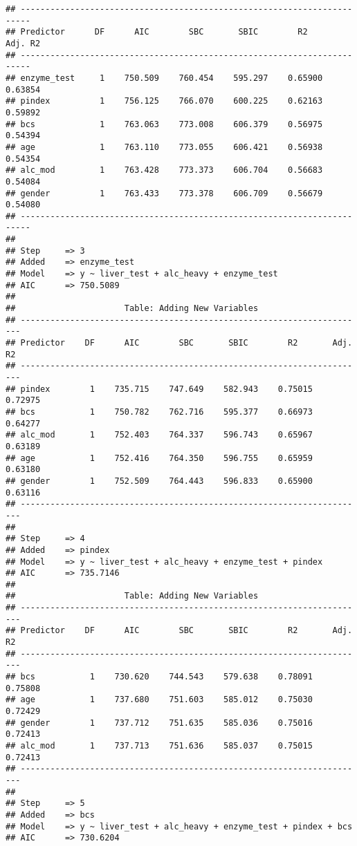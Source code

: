 \documentclass[
]{article}
\begin{document}
\begin{verbatim}
## ------------------------------------------------------------------------
## Predictor      DF      AIC        SBC       SBIC        R2       Adj. R2 
## ------------------------------------------------------------------------
## enzyme_test     1    750.509    760.454    595.297    0.65900    0.63854 
## pindex          1    756.125    766.070    600.225    0.62163    0.59892 
## bcs             1    763.063    773.008    606.379    0.56975    0.54394 
## age             1    763.110    773.055    606.421    0.56938    0.54354 
## alc_mod         1    763.428    773.373    606.704    0.56683    0.54084 
## gender          1    763.433    773.378    606.709    0.56679    0.54080 
## ------------------------------------------------------------------------
## 
## Step     => 3 
## Added    => enzyme_test 
## Model    => y ~ liver_test + alc_heavy + enzyme_test 
## AIC      => 750.5089 
## 
##                      Table: Adding New Variables                       
## ----------------------------------------------------------------------
## Predictor    DF      AIC        SBC       SBIC        R2       Adj. R2 
## ----------------------------------------------------------------------
## pindex        1    735.715    747.649    582.943    0.75015    0.72975 
## bcs           1    750.782    762.716    595.377    0.66973    0.64277 
## alc_mod       1    752.403    764.337    596.743    0.65967    0.63189 
## age           1    752.416    764.350    596.755    0.65959    0.63180 
## gender        1    752.509    764.443    596.833    0.65900    0.63116 
## ----------------------------------------------------------------------
## 
## Step     => 4 
## Added    => pindex 
## Model    => y ~ liver_test + alc_heavy + enzyme_test + pindex 
## AIC      => 735.7146 
## 
##                      Table: Adding New Variables                       
## ----------------------------------------------------------------------
## Predictor    DF      AIC        SBC       SBIC        R2       Adj. R2 
## ----------------------------------------------------------------------
## bcs           1    730.620    744.543    579.638    0.78091    0.75808 
## age           1    737.680    751.603    585.012    0.75030    0.72429 
## gender        1    737.712    751.635    585.036    0.75016    0.72413 
## alc_mod       1    737.713    751.636    585.037    0.75015    0.72413 
## ----------------------------------------------------------------------
## 
## Step     => 5 
## Added    => bcs 
## Model    => y ~ liver_test + alc_heavy + enzyme_test + pindex + bcs 
## AIC      => 730.6204 

\end{verbatim}
\end{document}
